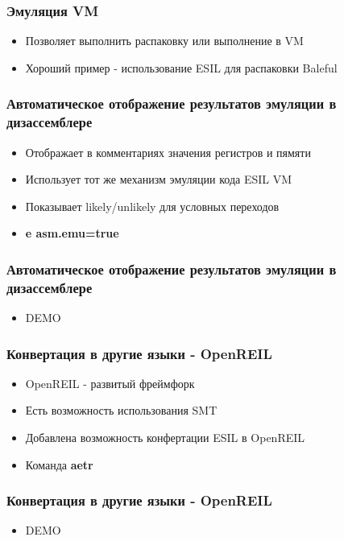 \documentclass[10pt,pdf,utf8,english,compress,hyperref={unicode}]{beamer}
\begin{document}
\begin{frame}[fragile]
  \frametitle{Эмуляция VM}
     \begin{itemize}
        \item Позволяет выполнить распаковку или выполнение в VM
		\item Хороший пример - использование ESIL для распаковки Baleful 
      \end{itemize}
\end{frame}

\begin{frame}[fragile]
  \frametitle{Автоматическое отображение результатов эмуляции в дизассемблере}
     \begin{itemize}
        \item Отображает в комментариях значения регистров и пямяти
		\item Использует тот же механизм эмуляции кода ESIL VM
		\item Показывает likely/unlikely для условных переходов
		\item \alert{\bf{e asm.emu=true}}
      \end{itemize}
\end{frame}

\begin{frame}[fragile]
  \frametitle{Автоматическое отображение результатов эмуляции в дизассемблере}
     \begin{itemize}
        \item DEMO
      \end{itemize}
\end{frame}

\begin{frame}[fragile]
  \frametitle{Конвертация в другие языки - OpenREIL}
     \begin{itemize}
        \item OpenREIL - развитый фреймфорк
		\item Есть возможность использования SMT
		\item Добавлена возможность конфертации ESIL в OpenREIL
		\item Команда \alert{\bf{aetr}}
      \end{itemize}
\end{frame}

\begin{frame}[fragile]
  \frametitle{Конвертация в другие языки - OpenREIL}
     \begin{itemize}
        \item DEMO
      \end{itemize}
\end{frame}
\end{document}
